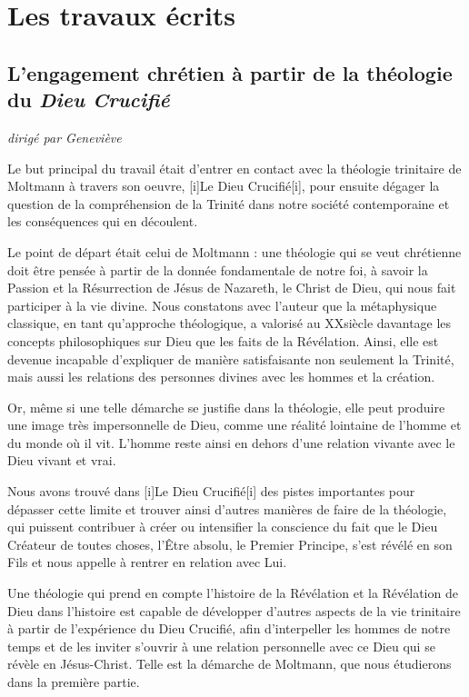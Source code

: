 \section{Les travaux écrits}

\subsection{L’engagement chrétien à partir de la théologie du \emph{Dieu Crucifié}}
{\footnotesize
\begin{flushright}
 \emph{dirigé par Geneviève }
 \end{flushright}
 }
Le but principal du travail était d’entrer en contact avec la théologie trinitaire de Moltmann à travers son oeuvre, [i]Le Dieu Crucifié[i], pour ensuite dégager la question de la compréhension de la Trinité dans notre société contemporaine et les conséquences qui en découlent.

Le point de départ était celui de Moltmann : une théologie qui se veut chrétienne doit être pensée à partir de la donnée fondamentale de notre foi, à savoir la Passion et la Résurrection de Jésus de Nazareth, le Christ de Dieu, qui nous fait participer à la vie divine. Nous constatons avec l’auteur que la métaphysique classique, en tant qu’approche théologique, a valorisé au XX\ieme siècle  davantage les concepts philosophiques sur Dieu que les faits de la Révélation. Ainsi, elle est devenue incapable d’expliquer de manière satisfaisante non seulement la Trinité, mais aussi les relations  des personnes  divines avec les hommes et la création.

Or, même si une telle démarche se justifie dans la théologie, elle peut produire une image très impersonnelle de Dieu, comme une réalité lointaine de l’homme et du monde où il vit. L’homme reste ainsi en dehors d’une relation vivante avec le Dieu vivant et vrai.

Nous avons trouvé dans [i]Le Dieu Crucifié[i] des pistes importantes pour dépasser cette limite et trouver ainsi d’autres manières de faire de la théologie, qui puissent contribuer à créer ou intensifier la conscience du fait que le Dieu Créateur  de toutes choses, l’Être absolu, le Premier Principe, s’est révélé en son Fils et nous appelle à rentrer  en relation avec Lui.

Une théologie qui prend en compte l’histoire de la Révélation et la Révélation de Dieu dans l’histoire est capable de développer d’autres aspects de la vie trinitaire à partir  de l’expérience du Dieu Crucifié, afin d’interpeller les hommes de notre temps et de les inviter  s’ouvrir à une relation personnelle avec ce Dieu qui se révèle en Jésus-Christ. Telle est la démarche de Moltmann,  que nous étudierons  dans la première partie.

